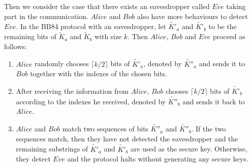 \documentclass[runningheads]{llncs}
\begin{document}
Then we consider the case that there exists an eavesdropper called $Eve$ taking part in the communication. $Alice$ and $Bob$ also have more behaviours to detect $Eve$. In the BB84 protocol with an eavesdropper, let $\tilde{K'}_a$ and $\tilde{K'}_b$ to be the remaining bits of $\tilde{K}_a$ and $\tilde{K}_b$ with size $k$. Then $Alice$, $Bob$ and $Eve$ proceed as follows:
\begin{enumerate}
	\item $Alice$ randomly chooses $\lceil k/2\rceil$ bits of $\tilde{K'}_a$, denoted by $\tilde{K''}_a$ and sends it to $Bob$ together with the indexes of the chosen bits.
	\item After receiving the information from $Alice$, $Bob$ chooses $\lceil k/2\rceil$ bits of $\tilde{K'}_b$ according to the indexes he received, denoted by $\tilde{K''}_b$ and sends it back to $Alice$.
	\item $Alice$ and $Bob$ match two sequences of bits $\tilde{K''}_{a}$ and $\tilde{K''}_{b}$. If the two sequences match, then they have not detected the eavesdropper and the remaining substrings of $\tilde{K'}_{a}$ and $\tilde{K'}_{b}$ are used as the secure key. Otherwise, they detect $Eve$ and the protocol halts without generating any secure keys.
\end{enumerate}
\end{document}
